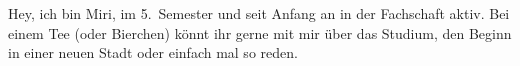 \begin{multicols*}{2}
{Hey, ich bin Miri, im 5.~Semester und seit Anfang an in der Fachschaft aktiv.
Bei einem Tee (oder Bierchen) könnt ihr gerne mit mir über das Studium, den Beginn in einer neuen Stadt oder einfach mal so reden.
\vspace{1ex}}


\end{multicols*}
